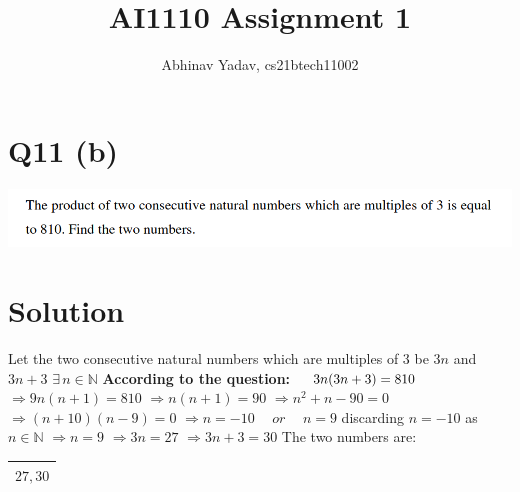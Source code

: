 \documentclass[11pt, letterpaper]{article}
\title{AI1110 Assignment 1}
\author{Abhinav Yadav, cs21btech11002}
\begin{document}
    \maketitle
    \section*{Q11 (b)}
    \includegraphics[width=\textwidth]{q11_b.png}
    \section*{Solution}
    Let the two consecutive natural numbers which are multiples of $3$ be $3n$ and $3n+3$
    \hspace{5pt} $\exists \hspace{2pt} n \in \mathbb{N}$\newline
    \newline
    \textbf{According to the question:}\newline
    $\hspace*{12pt} 3n(3n+3) = 810$\newline
    $\Rightarrow 9n(n+1)=810$\newline
    $\Rightarrow n(n+1)=90$\newline
    $\Rightarrow n^2+n-90=0$\newline
    $\Rightarrow (n+10)(n-9)=0$\newline
    $\Rightarrow n=-10 \hspace{15pt} or \hspace{15pt} n=9$\newline\newline
    \hspace*{11pt} discarding $n=-10$ as $n \in \mathbb{N}$\newline\newline
    $\Rightarrow n=9$\newline
    $\Rightarrow 3n=27$\newline
    $\Rightarrow 3n+3=30$\newline
    The two numbers are:\newline

    \begin{tabular}{|c|}
        \hline
            $27, 30$\\
        \hline
    \end{tabular}
\end{document}
